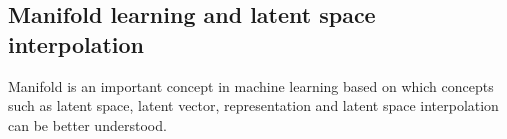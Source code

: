 \documentclass[12pt,a4paper]{article}
\begin{document}
% 


\subsection{Manifold learning and latent space interpolation}
Manifold is an important concept in machine learning based on which concepts such as latent space, latent vector, representation and latent space interpolation can be better understood. 
\end{document}
